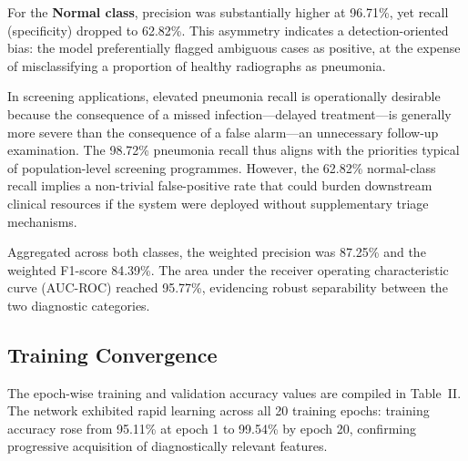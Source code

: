 \documentclass[conference]{IEEEtran}
\begin{document}
For the \textbf{Normal class}, precision was substantially higher at 96.71\%, yet recall (specificity) dropped to 62.82\%. This asymmetry indicates a detection-oriented bias: the model preferentially flagged ambiguous cases as positive, at the expense of misclassifying a proportion of healthy radiographs as pneumonia.

In screening applications, elevated pneumonia recall is operationally desirable because the consequence of a missed infection---delayed treatment---is generally more severe than the consequence of a false alarm---an unnecessary follow-up examination. The 98.72\% pneumonia recall thus aligns with the priorities typical of population-level screening programmes. However, the 62.82\% normal-class recall implies a non-trivial false-positive rate that could burden downstream clinical resources if the system were deployed without supplementary triage mechanisms.

Aggregated across both classes, the weighted precision was 87.25\% and the weighted F1-score 84.39\%. The area under the receiver operating characteristic curve (AUC-ROC) reached 95.77\%, evidencing robust separability between the two diagnostic categories.

\subsection{Training Convergence}

The epoch-wise training and validation accuracy values are compiled in Table~II. The network exhibited rapid learning across all 20 training epochs: training accuracy rose from 95.11\% at epoch 1 to 99.54\% by epoch 20, confirming progressive acquisition of diagnostically relevant features.
\end{document}
